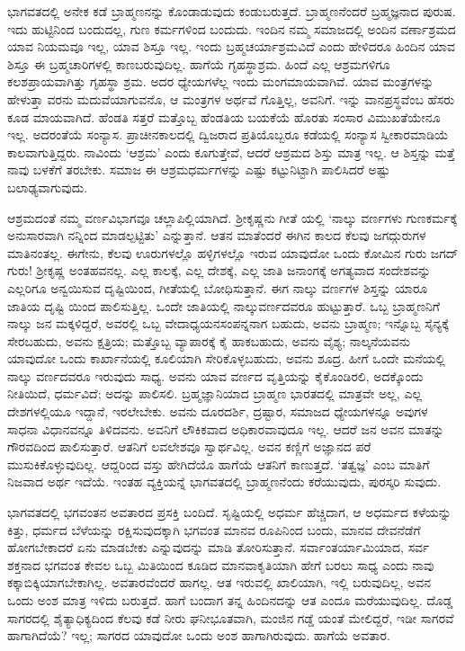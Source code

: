 ಭಾಗವತದಲ್ಲಿ ಅನೇಕ ಕಡೆ ಬ್ರಾಹ್ಮಣನನ್ನು ಕೊಂಡಾಡುವುದು ಕಂಡುಬರುತ್ತದೆ. ಬ್ರಾಹ್ಮಣನೆಂದರೆ ಬ್ರಹ್ಮಜ್ಞನಾದ ಪುರುಷ. ಇದು ಹುಟ್ಟಿನಿಂದ ಬಂದುದಲ್ಲ, ಗುಣ ಕರ್ಮಗಳಿಂದ ಬಂದುದು. ಇಂದಿನ ನಮ್ಮ ಸಮಾಜದಲ್ಲಿ ಅಂದಿನ ವರ್ಣಾಶ್ರಮದ ಯಾವ ನಿಯಮವೂ ಇಲ್ಲ, ಯಾವ ಶಿಸ್ತೂ ಇಲ್ಲ. ಇಂದು ಬ್ರಹ್ಮಚರ್ಯಾಶ್ರಮವಿದೆ ಎಂದು ಹೇಳಿದರೂ ಹಿಂದಿನ ಯಾವ ಶಿಸ್ತೂ ಈ ಬ್ರಹ್ಮಚಾರಿಗಳಲ್ಲಿ ಕಾಣಬರುವುದಿಲ್ಲ. ಹಾಗೆಯೆ ಗೃಹಸ್ಥಾಶ್ರಮ. ಹಿಂದೆ ಎಲ್ಲ ಆಶ್ರಮಗಳಿಗೂ ಕಲಶಪ್ರಾಯವಾಗಿತ್ತು ಗೃಹಸ್ಥಾ ಶ್ರಮ. ಅದರ ಧ್ಯೇಯಗಳೆಲ್ಲ ಇಂದು ಮಂಗಮಾಯವಾಗಿವೆ. ಯಾವ ಮಂತ್ರಗಳನ್ನು ಹೇಳುತ್ತಾ ವರನು ಮದುವೆಯಾಗುವನೊ, ಆ ಮಂತ್ರಗಳ ಅರ್ಥವೆ ಗೊತ್ತಿಲ್ಲ, ಅವನಿಗೆ. ಇನ್ನು ವಾನಪ್ರಸ್ಥವೆಂಬ ಹೆಸರು ಕೂಡ ಮಾಯವಾಗಿದೆ. ಹೆಂಡತಿ ಸತ್ತರೆ ಮತ್ತೊಬ್ಬ ಹೆಂಡತಿಯ ಬಯಕೆಯೆ ಹೊರತು ಸಂಸಾರ ವಿಮುಖತೆಯೇನೂ ಇಲ್ಲ. ಅದರಂತೆಯೆ ಸಂನ್ಯಾಸ. ಪ್ರಾಚೀನಕಾಲದಲ್ಲಿ ದ್ವಿಜರಾದ ಪ್ರತಿಯೊಬ್ಬರೂ ಕಡೆಯಲ್ಲಿ ಸಂನ್ಯಾಸ ಸ್ವೀಕಾರಮಾಡಿಯೆ ಕಾಲವಾಗುತ್ತಿದ್ದರು. ನಾವಿಂದು ‘ಆಶ್ರಮ’ ಎಂದು ಕೂಗುತ್ತೇವೆ, ಆದರೆ ಆಶ್ರಮದ ಶಿಸ್ತು ಮಾತ್ರ ಇಲ್ಲ. ಆ ಶಿಸ್ತನ್ನು ಮತ್ತೆ ನಾವು ಬಳಕೆಗೆ ತರಬೇಕು. ಸಮಾಜ ಈ ಆಶ್ರಮಧರ್ಮಗಳನ್ನು ಎಷ್ಟು ಕಟ್ಟುನಿಟ್ಟಾಗಿ ಪಾಲಿಸಿದರೆ ಅಷ್ಟು ಬಲಾಢ್ಯವಾಗುವುದು.

ಆಶ್ರಮದಂತೆ ನಮ್ಮ ವರ್ಣವಿಭಾಗವೂ ಚಲ್ಲಾಪಿಲ್ಲಿಯಾಗಿದೆ. ಶ್ರೀಕೃಷ್ಣನು ಗೀತೆ ಯಲ್ಲಿ ‘ನಾಲ್ಕು ವರ್ಣಗಳು ಗುಣಕರ್ಮಕ್ಕೆ ಅನುಸಾರವಾಗಿ ನನ್ನಿಂದ ಮಾಡಲ್ಪಟ್ಟಿತು’ ಎನ್ನುತ್ತಾನೆ. ಆತನ ಮಾತೆಂದರೆ ಈಗಿನ ಕಾಲದ ಕೆಲವು ಜಗದ್ಗುರುಗಳ ಮಾತಿನಂತಲ್ಲ. ಈಗೇನು, ಕೆಲವು ಊರುಗಳಲ್ಲೊ ಹಳ್ಳಿಗಳಲ್ಲೊ ಇರುವ ಯಾವುದೋ ಒಂದು ಕೋಮಿನ ಗುರು ಜಗದ್​ಗುರು! ಶ್ರೀಕೃಷ್ಣ ಅಂತಹವನಲ್ಲ. ಎಲ್ಲ ಕಾಲಕ್ಕೆ, ಎಲ್ಲ ದೇಶಕ್ಕೆ, ಎಲ್ಲ ಜಾತಿ ಜನಾಂಗಕ್ಕೆ ಅಗತ್ಯವಾದ ಸಂದೇಶವನ್ನು ಎಲ್ಲರಿಗೂ ಅನ್ವಯಿಸುವ ದೃಷ್ಟಿಯಿಂದ, ಗೀತೆಯಲ್ಲಿ ಬೋಧಿಸುತ್ತಾನೆ. ಈಗ ನಾಲ್ಕು ವರ್ಣಗಳ ಶಿಸ್ತನ್ನು ಯಾರೂ ಜಾತಿಯ ದೃಷ್ಟಿ ಯಿಂದ ಪಾಲಿಸುತ್ತಿಲ್ಲ. ಒಂದೇ ಜಾತಿಯಲ್ಲಿ ನಾಲ್ಕುವರ್ಣದವರೂ ಹುಟ್ಟುತ್ತಾರೆ. ಒಬ್ಬ ಬ್ರಾಹ್ಮಣನಿಗೆ ನಾಲ್ಕು ಜನ ಮಕ್ಕಳಿದ್ದರೆ, ಅವರಲ್ಲಿ ಒಬ್ಬ ವೇದಾಧ್ಯಯನಸಂಪನ್ನನಾಗ ಬಹುದು, ಅವನು ಬ್ರಾಹ್ಮಣ; ಇನ್ನೊಬ್ಬ ಸೈನ್ಯಕ್ಕೆ ಸೇರಬಹುದು, ಅವನು ಕ್ಷತ್ರಿಯ; ಮತ್ತೊಬ್ಬ ವ್ಯಾಪಾರಕ್ಕೆ ಕೈ ಹಾಕಬಹುದು, ಅವನು ವೈಶ್ಯ; ನಾಲ್ಕನೆಯವನು ಯಾವುದೋ ಒಂದು ಕಾರ್ಖಾನೆಯಲ್ಲಿ ಕೂಲಿಯಾಗಿ ಸೇರಿಕೊಳ್ಳಬಹುದು, ಅವನು ಶೂದ್ರ. ಹೀಗೆ ಒಂದೇ ಮನೆಯಲ್ಲಿ ನಾಲ್ಕು ವರ್ಣದವರೂ ಇರುವುದು ಸಾಧ್ಯ. ಅವನು ಯಾವ ವರ್ಣದ ವೃತ್ತಿಯನ್ನು ಕೈಕೊಂಡಿರಲಿ, ಅದಕ್ಕೊಂದು ನೀತಿಯಿದೆ, ಧರ್ಮವಿದೆ; ಅದನ್ನು ಪಾಲಿಸಲಿ. ಬ್ರಹ್ಮಜ್ಞಾನಿಯಾದ ಬ್ರಾಹ್ಮಣ ಭಾರತದಲ್ಲಿ ಮಾತ್ರವೇ ಅಲ್ಲ, ಎಲ್ಲ ದೇಶಗಳಲ್ಲಿಯೂ ಇದ್ದಾನೆ, ಇರಲೇಬೇಕು. ಅವನು ದೂರದರ್ಶಿ, ದ್ರಷ್ಟಾರ, ಸಮಾಜದ ಧ್ಯೇಯಗಳನ್ನೂ ಅವುಗಳ ಸಾಧನಾ ವಿಧಾನವನ್ನೂ ತಿಳಿದವನು. ಅವನಿಗೆ ಲೌಕಿಕವಾದ ಅಧಿಕಾರವಾವುದೂ ಇಲ್ಲ. ಆದರೆ ಜನ ಅವನ ಮಾತನ್ನು ಗೌರವದಿಂದ ಪಾಲಿಸುತ್ತಾರೆ. ಆತನಿಗೆ ಲವಲೇಶವೂ ಸ್ವಾರ್ಥವಿಲ್ಲ. ಅವನ ಕಣ್ಣಿಗೆ ಅಜ್ಞಾನದ ಪರೆ ಮುಸುಕಿಕೊಳ್ಳುವುದಿಲ್ಲ. ಆದ್ದರಿಂದ ವಸ್ತು ಹೇಗಿದೆಯೊ ಹಾಗೆಯೆ ಆತನಿಗೆ ಕಾಣುತ್ತದೆ. ‘ತತ್ವಜ್ಞ’ ಎಂಬ ಮಾತಿಗೆ ನಿಜವಾದ ಅರ್ಥ ಇದೆಯೆ. ಇಂತಹ ವ್ಯಕ್ತಿಯನ್ನೆ ಭಾಗವತದಲ್ಲಿ ಬ್ರಾಹ್ಮಣನೆಂದು ಕರೆಯುವುದು, ಪುರಸ್ಕರಿ ಸುವುದು.

ಭಾಗವತದಲ್ಲಿ ಭಗವಂತನ ಅವತಾರದ ಪ್ರಸಕ್ತಿ ಬಂದಿದೆ. ಸೃಷ್ಟಿಯಲ್ಲಿ ಅಧರ್ಮ ಹೆಚ್ಚಿದಾಗ, ಆ ಅಧರ್ಮದ ಕಳೆಯನ್ನು ಕಿತ್ತು, ಧರ್ಮದ ಬೆಳೆಯನ್ನು ರಕ್ಷಿಸುವುದಕ್ಕಾಗಿ ಭಗವಂತ ಮಾನವ ರೂಪಿನಿಂದ ಬಂದು, ಮಾನವ ದೇವನೆಡೆಗೆ ಹೋಗಬೇಕಾದರೆ ಏನು ಮಾಡಬೇಕು ಎನ್ನುವುದನ್ನು ಮಾಡಿ ತೋರಿಸುತ್ತಾನೆ. ಸರ್ವಾಂತರ್ಯಾಮಿಯಾದ, ಸರ್ವ ಶಕ್ತನಾದ ಭಗವಂತ ಕೇವಲ ಒಬ್ಬ ಮಿತಿಯಿಂದ ಕೂಡಿದ ಮಾನವಾಕೃತಿಯಾಗಿ ಹೇಗೆ ಬರಲು ಸಾಧ್ಯ ಎಂದು ನಾವು ಕಕ್ಕಾಬಿಕ್ಕಿಯಾಗಬೇಕಾಗಿಲ್ಲ. ಅವತಾರವೆಂದರೆ ಹಾಗಲ್ಲ. ಆತ ಇರುವಲ್ಲಿ ಖಾಲಿಯಾಗಿ, ಇಲ್ಲಿ ಬರುವುದಿಲ್ಲ, ಅವನ ಒಂದು ಅಂಶ ಮಾತ್ರ ಇಳಿದು ಬರುತ್ತದೆ. ಹಾಗೆ ಬಂದಾಗ ತನ್ನ ಹಿಂದಿನದನ್ನು ಆತ ಎಂದೂ ಮರೆಯುವುದಿಲ್ಲ. ದೊಡ್ಡ ಸಾಗರದಲ್ಲಿ ಶೈತ್ಯಾಧಿಕ್ಯದಿಂದ ಕೆಲವು ಕಡೆ ನೀರು ಘನೀಭೂತವಾಗಿ, ಮಂಜಿನ ಗಡ್ಡೆ ಯಂತೆ ಮೇಲಿದ್ದರೆ, ಇಡೀ ಸಾಗರವೆ ಹಾಗಾಗಿದೆಯೆ? ಇಲ್ಲ; ಸಾಗರದ ಯಾವುದೋ ಒಂದು ಅಂಶ ಹಾಗಾಗಿರುವುದು. ಹಾಗೆಯೆ ಅವತಾರ.

